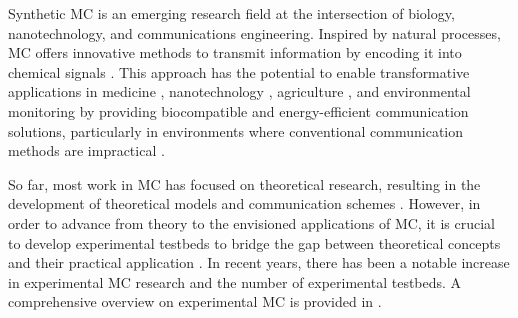 Synthetic \ac{MC} is an emerging research field at the intersection of biology, nanotechnology, and communications engineering. Inspired by natural processes, \ac{MC} offers innovative methods to transmit information by encoding it into chemical signals \cite{nakano2013molecular}. This approach has the potential to enable transformative applications in medicine \cite{felicetti2016applications,akyildiz2015internet}, nanotechnology \cite{Akan2012nanonetworks,soldner2020survey}, agriculture \cite{Dixon1990agricultural}, and environmental monitoring \cite{nakano2012molecular} by providing biocompatible and energy-efficient communication solutions, particularly in environments where conventional communication methods are impractical \cite{farsad2016comprehensive}.

So far, most work in \ac{MC} has focused on theoretical research, resulting in the development of theoretical models and communication schemes \cite{jamali2019channel,kuscu2019transmitter,kuran2020survey, farsad2016comprehensive}.
However, in order to advance from theory to the envisioned applications of \ac{MC}, it is crucial to develop experimental testbeds to bridge the gap between theoretical concepts and their practical application \cite{lotter2023experimental}. 
In recent years, there has been a notable increase in experimental \ac{MC} research and the number of experimental testbeds. A comprehensive overview on experimental \ac{MC} is provided in \cite{lotter2023experimental, Lotter2023testbedII}. 


